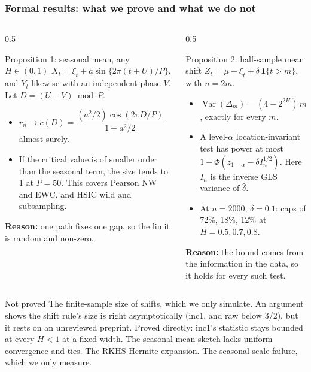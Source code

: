 \documentclass[11pt, aspectratio=169, xcolor={dvipsnames}]{beamer}
\begin{document}
\begin{frame}
\frametitle{Formal results: what we prove and what we do not}
\footnotesize
\begin{columns}[T]
\begin{column}{0.5\textwidth}
\begin{block}{Proposition 1: seasonal mean, any $H\in(0,1)$}\footnotesize
$X_t=\xi_t+a\sin\{2\pi(t+U)/P\}$, and $Y_t$ likewise with an independent phase $V$. Let $D=(U-V)\bmod P$.
\begin{itemize}
\item $r_n\to c(D)=\dfrac{(a^2/2)\cos(2\pi D/P)}{1+a^2/2}$ almost surely.
\item If the critical value is of smaller order than the seasonal term, the size tends to 1 at $P=50$. This covers Pearson NW and EWC, and HSIC wild and subsampling.
\end{itemize}
\textbf{Reason:} one path fixes one gap, so the limit is random and non-zero.
\end{block}
\end{column}
\begin{column}{0.5\textwidth}
\begin{block}{Proposition 2: half-sample mean shift}\footnotesize
$Z_t=\mu+\xi_t+\delta\,\mathbf 1\{t>m\}$, with $n=2m$.
\begin{itemize}
\item $\operatorname{Var}(\Delta_m)=(4-2^{2H})\,m^{2H-2}$, exactly for every $m$.
\item A level-$\alpha$ location-invariant test has power at most $1-\Phi(z_{1-\alpha}-\delta I_n^{1/2})$. Here $I_n$ is the inverse GLS variance of $\hat\delta$.
\item At $n=2000$, $\delta=0.1$: caps of 72\%, 18\%, 12\% at $H=0.5, 0.7, 0.8$.
\end{itemize}
\textbf{Reason:} the bound comes from the information in the data, so it holds for every such test.
\end{block}
\end{column}
\end{columns}
\vspace{-1.5mm}
\begin{alertblock}{Not proved}\scriptsize
The finite-sample size of shifts, which we only simulate. An argument shows the shift rule's size is right asymptotically (inc1, and raw below 3/2), but it rests on an unreviewed preprint. Proved directly: inc1's statistic stays bounded at every $H<1$ at a fixed width. The seasonal-mean sketch lacks uniform convergence and ties. The RKHS Hermite expansion. The seasonal-scale failure, which we only measure.
\end{alertblock}
\end{frame}
\end{document}
